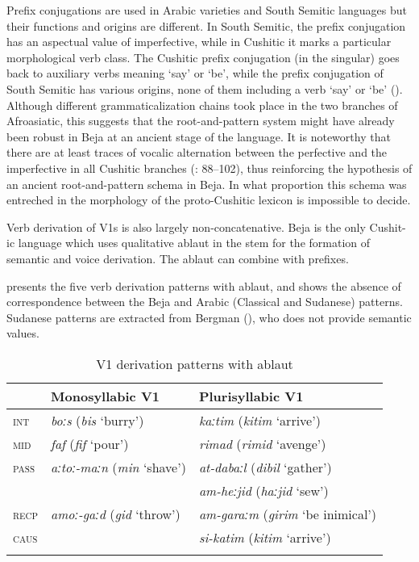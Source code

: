 \documentclass[output=paper]{langsci/langscibook}
\begin{document}
Prefix conjugations are used in Arabic varieties and South Semitic languages but their functions and origins are different. In South Semitic, the prefix conjugation has an aspectual value of imperfective, while in Cushitic it marks a particular morphological verb class. The Cushitic prefix conjugation (in the singular) goes back to auxiliary verbs meaning ‘say’ or ‘be’, while the prefix conjugation of South Semitic has various origins, none of them including a verb ‘say’ or ‘be’ (\citealt{Cohen1984}). Although different grammaticalization chains took place in the two branches of Afroasiatic, this suggests that the root-and-pattern system might have already been robust in Beja at an ancient stage of the language. It is noteworthy that there are at least traces of vocalic alternation between the perfective and the imperfective in all Cushitic branches (\citealt{Cohen1984}: 88--102), thus reinforcing the hypothesis of an ancient root-and-pattern schema in Beja. In what proportion this schema was entreched in the morphology of the proto-Cushitic lexicon is impossible to decide.

Verb derivation of V1s is also largely non-concatenative. Beja is the only Cushit-ic language which uses qualitative ablaut in the stem for the formation of semantic and voice derivation. The ablaut can combine with prefixes. 

 presents the five verb derivation patterns with ablaut, and  shows the absence of correspondence between the Beja and Arabic (Classical and Sudanese) patterns. Sudanese patterns are extracted from Bergman (\citeyear[32--34]{Bergman2002}), who does not provide semantic values.

\begin{table}
\begin{tabular}{lll}\lsptoprule 
& Monosyllabic V1 &  Plurisyllabic V1\\\midrule
\textsc{int} & \textit{boːs} (\textit{bis} ‘burry’) & \textit{kaːtim} (\textit{kitim} ‘arrive’)\\
\textsc{mid} & \textit{faf} (\textit{fif} ‘pour’) & \textit{rimad} (\textit{rimid} ‘avenge’)\\
\textsc{pass} & \textit{aːtoː-maːn} (\textit{min} ‘shave’) & \textit{at-dabaːl} (\textit{dibil} ‘gather’)\\
&  & \textit{am-heːjid} (\textit{haːjid} ‘sew’)\\
\textsc{recp} & \textit{amoː-gaːd} (\textit{gid} ‘throw’) & \textit{am-garaːm} (\textit{girim} ‘be inimical’)\\
\textsc{caus} &  & \textit{si-katim} (\textit{kitim} ‘arrive’)\\
\lspbottomrule
\end{tabular} 
\caption{V1 derivation patterns with ablaut}
\label{tab:V1}
\end{table}
\end{document}
